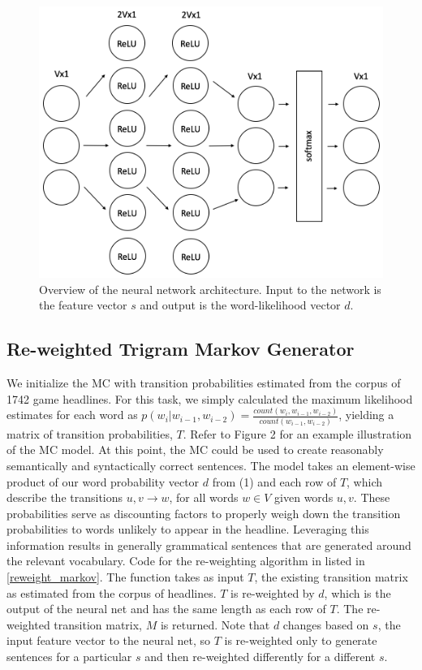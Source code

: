 \documentclass[12pt, journal]{IEEEtran}
\begin{document}
\begin{figure}[h!]
\centering
\includegraphics[width=.6\textwidth]{NN.png}
\caption{Overview of the neural network architecture. Input to the network is the feature vector $s$ and output is the word-likelihood vector $d$.}
\label{NN}
\end{figure}

\subsection{Re-weighted Trigram Markov Generator}
We initialize the MC with transition probabilities estimated from the corpus of 1742 game headlines. For this task, we simply calculated the maximum likelihood estimates for each word as $p(w_i|w_{i-1},w_{i-2}) = \frac{count(w_i, w_{i-1}, w_{i-2})}{count(w_{i-1},w_{i-2})}$, yielding a matrix of transition probabilities, $T$. Refer to Figure 2 for an example illustration of the MC model. At this point, the MC could be used to create reasonably semantically and syntactically correct sentences. The model takes an element-wise product of our word probability vector $d$ from (1) and each row of $T$, which describe the transitions $u, v \rightarrow w$, for all words $w \in V$ given words $u, v$. These probabilities serve as discounting factors to properly weigh down the transition probabilities to words unlikely to appear in the headline. Leveraging this information results in generally grammatical sentences that are generated around the relevant vocabulary. Code for the re-weighting algorithm in listed in \ref{reweight_markov}. The function takes as input $T$, the existing transition matrix as estimated from the corpus of headlines. $T$ is re-weighted by $d$, which is the output of the neural net and has the same length as each row of $T$. The re-weighted transition matrix, $M$ is returned. Note that $d$ changes based on $s$, the input feature vector to the neural net, so $T$ is re-weighted only to generate sentences for a particular $s$ and then re-weighted differently for a different $s$.
\end{document}
